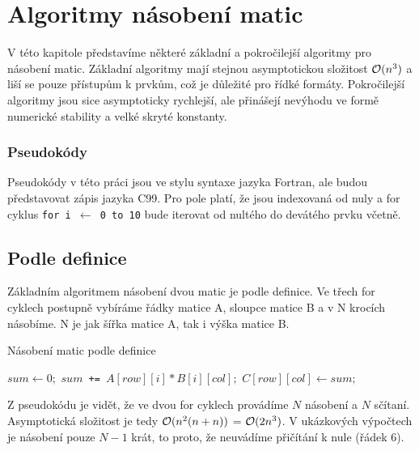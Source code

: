 \chapter{Algoritmy násobení matic}
\label{algo}

V této kapitole představíme některé základní a pokročilejší algoritmy pro násobení matic. Základní algoritmy mají stejnou asymptotickou složitost $\mathcal{O}(n^3)$ a liší se pouze přístupům k prvkům, což je důležité pro řídké formáty. Pokročilejší algoritmy jsou sice asymptoticky rychlejší, ale přinášejí nevýhodu ve formě numerické stability a velké skryté konstanty.

\subsection{Pseudokódy}

Pseudokódy v této práci jsou ve stylu syntaxe jazyka Fortran, ale budou představovat zápis jazyka C99. Pro pole platí, že jsou indexovaná od nuly a for cyklus \texttt{for i $\gets$ 0 to 10} bude iterovat od nultého do devátého prvku včetně.

\section{Podle definice}

Základním algoritmem násobení dvou matic je podle definice. Ve třech for cyklech postupně  vybíráme řádky matice A, sloupce matice B a v N krocích násobíme. N je jak šířka matice A, tak i výška matice B.

\begin{algorithm}[H]
	\caption{Násobení matic podle definice}\label{mmm-by-definiton}
	\begin{algorithmic}[1]
		\State \texttt{$sum \gets 0;$}
			\State \texttt{$sum $ += $ A[row][i] * B[i][col];$}
		\EndFor
		\State \texttt{$C[row][col] \gets sum;$}
	\EndFor
\EndFor
		\EndProcedure
	\end{algorithmic}
\end{algorithm}

Z pseudokódu je vidět, že ve dvou for cyklech provádíme $N$ násobení a $N$ sčítaní. Asymptotická složitost je tedy $\mathcal{O}(n^2(n + n))$ = $\mathcal{O}(2n^3)$. V ukázkových výpočtech je násobení pouze $N-1$ krát, to proto, že neuvádíme přičítání k nule (řádek 6).

